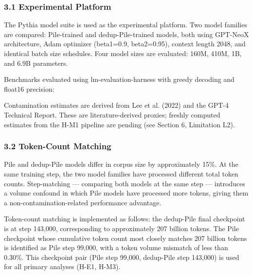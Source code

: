 
\subsubsection{3.1 Experimental Platform}

The Pythia model suite is used as the experimental platform. Two model families are compared: Pile-trained and dedup-Pile-trained models, both using GPT-NeoX architecture, Adam optimizer (beta1=0.9, beta2=0.95), context length 2048, and identical batch size schedules. Four model sizes are evaluated: 160M, 410M, 1B, and 6.9B parameters.

Benchmarks evaluated using lm-evaluation-harness \citep{EleutherAI2023Harness} with greedy decoding and float16 precision:

\begin{table}[htbp]
\centering
{}
\end{table}

Contamination estimates are derived from Lee et al. (2022) and the GPT-4 Technical Report. These are literature-derived proxies; freshly computed estimates from the H-M1 pipeline are pending (see Section 6, Limitation L2).

\subsubsection{3.2 Token-Count Matching}

Pile and dedup-Pile models differ in corpus size by approximately 15\%. At the same training step, the two model families have processed different total token counts. Step-matching --- comparing both models at the same step --- introduces a volume confound in which Pile models have processed more tokens, giving them a non-contamination-related performance advantage.

Token-count matching is implemented as follows: the dedup-Pile final checkpoint is at step 143,000, corresponding to approximately 207 billion tokens. The Pile checkpoint whose cumulative token count most closely matches 207 billion tokens is identified as Pile step 99,000, with a token volume mismatch of less than 0.30\%. This checkpoint pair (Pile step 99,000, dedup-Pile step 143,000) is used for all primary analyses (H-E1, H-M3).

